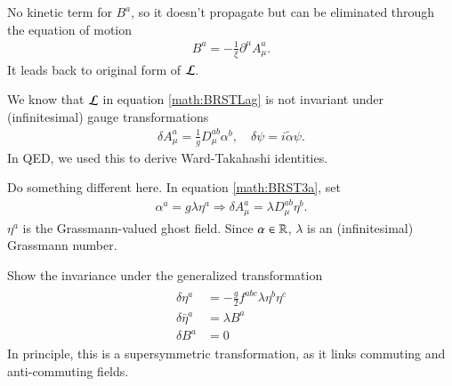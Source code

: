 No kinetic term for $B^a$, so it doesn't propagate but can be eliminated through the equation of motion 
\begin{align}
   B^a = - \frac{1}{\xi} \partial^\mu A_\mu^a.
   \label{math:BRSTEOM}
\end{align}
It leads back to original form of $\mathcal{L}$.

We know that $\mathcal{L}$ in equation \ref{math:BRSTLag} is not invariant  under (infinitesimal) gauge transformations
\begin{align}
   \delta A_\mu^a = \frac{1}{g} D_\mu^{ab} \alpha^b, \quad \delta \psi = i \tilde{\alpha} \psi.
   \label{math:BRST3a}
\end{align}
In QED, we used this to derive Ward-Takahashi identities.

Do something different here. In equation \ref{math:BRST3a}, set
\begin{align*}
   \alpha^a = g \lambda \eta^a \Rightarrow \delta A_\mu^a = \lambda D_\mu^{ab} \eta^b.
\end{align*}
$\eta^a$ is the Grassmann-valued ghost field. Since $\alpha \in \mathbb{R}$, $\lambda$ is an (infinitesimal) Grassmann number.

Show the invariance under the generalized transformation
\begin{align}
   \begin{split}
      \delta \eta^a &= - \frac{g}{2} f^{abc} \lambda \eta^b \eta^c \\
      \delta \bar \eta^a &= \lambda B^a \\
      \delta B^a &= 0
   \end{split}
   \label{math:BRST3b}
\end{align}
In principle, this is a supersymmetric transformation, as it links commuting and anti-commuting fields.

